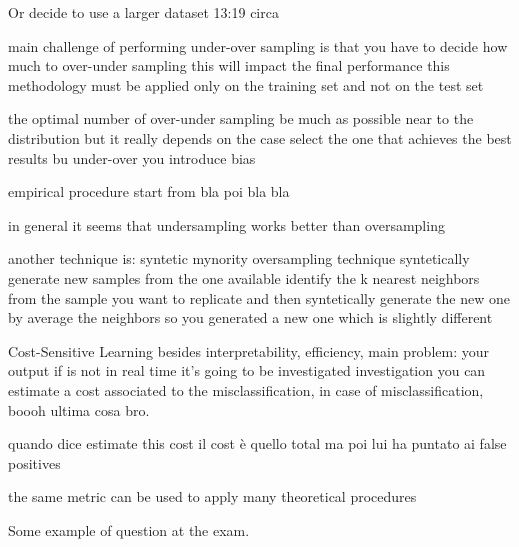             Or decide to use a larger dataset 13:19 circa 

                main challenge of performing under-over sampling is that you have to decide
                    how much to over-under sampling 
                    this will impact the final performance 
                    this methodology must be applied only on the training set and not on the test set 

                    the optimal number of over-under sampling 
                    be much as possible near to the distribution
                        but it really depends on the case 
                            select the one that achieves the best results 
                        bu under-over you introduce bias 

                        empirical procedure 
                            start from bla 
                            poi bla bla 

                        in general it seems that undersampling works better than oversampling 
                
                another technique is: syntetic mynority oversampling technique
                    syntetically generate new samples from the one available
                    identify the k nearest neighbors from the sample you want to replicate
                    and then syntetically generate the new one by average the neighbors
                    so you generated a new one which is slightly different 

        Cost-Sensitive Learning 
            besides interpretability, efficiency, main problem:
                your output if is not in real time it's going to be investigated 
                investigation 
                you can estimate a cost associated to the misclassification,
                in case of misclassification, boooh ultima cosa bro.

                quando dice estimate this cost il cost è quello total ma poi lui ha puntato ai false positives

                the same metric can be used to apply many theoretical procedures 

                Some example of question at the exam.
     \fi           
